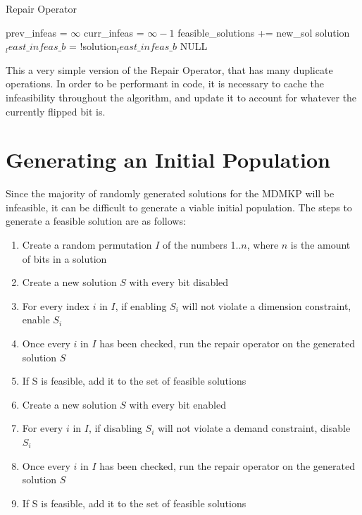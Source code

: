 \documentclass[11pt, letterpaper, onecolumn]{article}
\begin{document}
\begin{algorithm}
\caption{Repair Operator}
\begin{algorithmic}
\STATE prev\_infeas = $\infty$
\STATE curr\_infeas = $\infty-1$
\STATE feasible\_solutions += new\_sol
\ENDIF
\ENDIF
\ENDFOR
{}
\ENDIF
\STATE solution$_least\_infeas\_b$ = !solution$_least\_infeas\_b$
\ENDWHILE
\RETURN NULL
\end{algorithmic}
\end{algorithm}

This a very simple version of the Repair Operator, that has many duplicate operations. In order to be performant in code, it is necessary to cache the infeasibility throughout the algorithm, and update it to account for whatever the currently flipped bit is. 

\section{Generating an Initial Population}

Since the majority of randomly generated solutions for the MDMKP will be infeasible, it can be difficult to generate a viable initial population. The steps to generate a feasible solution are as follows:

\begin{enumerate}
\item Create a random permutation $I$ of the numbers 1..$n$, where $n$ is the amount of bits in a solution
\item Create a new solution $S$ with every bit disabled
\item For every index $i$ in $I$, if enabling $S_i$ will not violate a dimension constraint, enable $S_i$
\item Once every $i$ in $I$ has been checked, run the repair operator on the generated solution $S$
\item If S is feasible, add it to the set of feasible solutions
\item Create a new solution $S$ with every bit enabled
\item For every $i$ in $I$, if disabling $S_i$ will not violate a demand constraint, disable $S_i$
\item Once every $i$ in $I$ has been checked, run the repair operator on the generated solution $S$
\item If S is feasible, add it to the set of feasible solutions
\end{enumerate}
\end{document}
